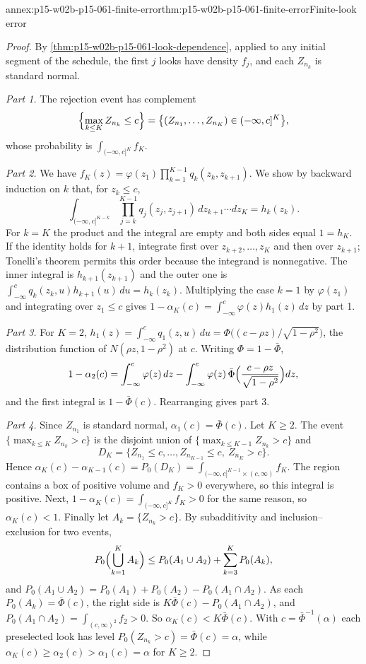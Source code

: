 \begin{annexitem}{annex:p15-w02b-p15-061-finite-error}{thm:p15-w02b-p15-061-finite-error}{Finite-look error}
\begin{proof}
By \cref{thm:p15-w02b-p15-061-look-dependence}, applied to any initial
segment of the schedule, the first \(j\) looks have density \(f_j\), and
each \(Z_{n_k}\) is standard normal.

\emph{Part 1.} The rejection event has complement
\[
 \Bigl\{\max_{k\leq K}Z_{n_k}\leq c\Bigr\}
 =\bigl\{(Z_{n_1},\ldots,Z_{n_K})\in(-\infty,c]^K\bigr\},
\]
whose probability is \(\int_{(-\infty,c]^K}f_K\).

\emph{Part 2.} We have
\(f_K(z)=\varphi(z_1)\prod_{k=1}^{K-1}q_k(z_k,z_{k+1})\). We show by
backward induction on \(k\) that, for \(z_k\leq c\),
\[
 \int_{(-\infty,c]^{K-k}}\prod_{j=k}^{K-1}q_j(z_j,z_{j+1})\,
 dz_{k+1}\cdots dz_K=h_k(z_k).
\]
For \(k=K\) the product and the integral are empty and both sides equal
\(1=h_K\). If the identity holds for \(k+1\), integrate first over
\(z_{k+2},\ldots,z_K\) and then over \(z_{k+1}\); Tonelli's theorem
permits this order because the integrand is nonnegative. The inner
integral is \(h_{k+1}(z_{k+1})\) and the outer one is
\(\int_{-\infty}^cq_k(z_k,u)h_{k+1}(u)\,du=h_k(z_k)\). Multiplying the
case \(k=1\) by \(\varphi(z_1)\) and integrating over \(z_1\leq c\)
gives \(1-\alpha_K(c)=\int_{-\infty}^c\varphi(z)h_1(z)\,dz\) by part 1.

\emph{Part 3.} For \(K=2\),
\(h_1(z)=\int_{-\infty}^cq_1(z,u)\,du
=\Phi\bigl((c-\rho z)/\sqrt{1-\rho^2}\bigr)\), the distribution function
of \(N(\rho z,1-\rho^2)\) at \(c\). Writing \(\Phi=1-\bar\Phi\),
\[
 1-\alpha_2(c)=\int_{-\infty}^c\varphi(z)\,dz
 -\int_{-\infty}^c\varphi(z)\,\bar\Phi\Bigl(\frac{c-\rho z}{\sqrt{1-\rho^2}}\Bigr)dz ,
\]
and the first integral is \(1-\bar\Phi(c)\). Rearranging gives part 3.

\emph{Part 4.} Since \(Z_{n_1}\) is standard normal,
\(\alpha_1(c)=\bar\Phi(c)\). Let \(K\geq2\). The event
\(\{\max_{k\leq K}Z_{n_k}>c\}\) is the disjoint union of
\(\{\max_{k\leq K-1}Z_{n_k}>c\}\) and
\[
 D_K=\{Z_{n_1}\leq c,\ldots,Z_{n_{K-1}}\leq c,\ Z_{n_K}>c\}.
\]
Hence \(\alpha_K(c)-\alpha_{K-1}(c)=P_0(D_K)=
\int_{(-\infty,c]^{K-1}\times(c,\infty)}f_K\). The region contains a
box of positive volume and \(f_K>0\) everywhere, so this integral is
positive. Next, \(1-\alpha_K(c)=\int_{(-\infty,c]^K}f_K>0\) for the same
reason, so \(\alpha_K(c)<1\). Finally let \(A_k=\{Z_{n_k}>c\}\). By
subadditivity and inclusion--exclusion for two events,
\[
 P_0\Bigl(\bigcup_{k=1}^KA_k\Bigr)\leq P_0(A_1\cup A_2)
 +\sum_{k=3}^KP_0(A_k),
\]
and \(P_0(A_1\cup A_2)=P_0(A_1)+P_0(A_2)-P_0(A_1\cap A_2)\). As each
\(P_0(A_k)=\bar\Phi(c)\), the right side is
\(K\bar\Phi(c)-P_0(A_1\cap A_2)\),
and \(P_0(A_1\cap A_2)=\int_{(c,\infty)^2}f_2>0\). So
\(\alpha_K(c)<K\bar\Phi(c)\). With \(c=\bar\Phi^{-1}(\alpha)\) each
preselected look has level \(P_0(Z_{n_k}>c)=\bar\Phi(c)=\alpha\), while
\(\alpha_K(c)\geq\alpha_2(c)>\alpha_1(c)=\alpha\) for \(K\geq2\).


\end{proof}
\end{annexitem}
